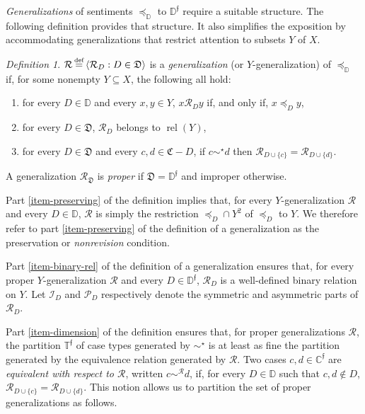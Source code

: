\documentclass[ecta,nameyear,draft]{econsocart}
\newcommand{\bs}{-}%
\newcommand{\mc}{\mathcal}
\newcommand\defeq{\mathrel{\overset{\makebox[0pt]{\mbox{\normalfont\tiny def}}}{=}}}%
\newcommand{\relations}{\operatorname{rel}}
\newcommand{\novel}{\mathfrak f}
\newcommand{\precsimb}{\mathbin{\preceq}}
\newcommand{\preceqb}{\mathbin{\preceq}}
\newcommand{\ext}{\mathrel{\mc R}}
\newcommand{\sext}{\mathrel{\mc P}}
\newcommand{\next}{\mathrel{\mc I}}
\newcommand{\extb}{\mathbin{\mc R}}
\newcommand{\mbbd}{{\mathds D}}
\newcommand{\mbbdp}{{\mathds D^{\novel}}}
\newcommand{\dpp}{{\mathfrak D}}
\newcommand{\mbbcp}{{\mathds C^{\novel}}}
\newcommand{\cpp}{{\mathfrak C}}
\newcommand{\mbbtp}{{\mathds{T}^\novel}}
\theoremstyle{plain}
\theoremstyle{remark}
\newtheorem{definition}{Definition}%
\begin{document}
\emph{Generalizations} of sentiments $\precsimb_\mbbd$ to
$\mbbdp$ require a suitable structure. The following definition provides that
structure. It also simplifies the exposition by accommodating generalizations
that restrict attention to subsets $Y$ of $X$.
\begin{definition}\label{def-{generalization}} $\extb \defeq \langle \extb_{D}:
  D\in \dpp \rangle$ is a \emph{{generalization}} (or $Y$-{generalization}) of
  $\preceq_{\mbbd}$ if, for some nonempty $Y \subseteq X$, the following all
  hold$:$
  \begin{enumerate}%
    \item \label{item-preserving} for every $D \in \mbbd$ and every $x,y\in Y$,
      $x \ext_{D} y$ if, and only if, $x \preceq_{D} y$,
    \item\label{item-binary-rel} for every $D\in \dpp$, $\ext_{D}$ belongs to
      $\relations (Y)$,
    \item \label{item-dimension} for every $D\in \dpp$ and every $c,d \in
      \cpp\bs D$,  if $c \sim^\star d$ then $\extb _ {D \cup \{c\}} = \extb _
      {D \cup \{d\}}$.
  \end{enumerate}
  A {generalization} $\ext_{\dpp}$ is \emph{proper} if $\dpp = \mbbdp$ and
  improper otherwise.
\end{definition}
Part \ref{item-preserving} of the definition implies that, for every
$Y$-{generalization} $\ext$ and every $D\in \mbbd$, $\ext$ is simply the
restriction $\preceqb_{D}\cap Y^{2}$ of $\preceq_{D}$ to $Y$.  We therefore
refer to part \ref{item-preserving} of the definition of a {generalization} as
the preservation or \emph{nonrevision} condition.

Part \ref{item-binary-rel} of the definition of a {generalization} ensures
that, for every proper $Y$-{generalization} $\ext$ and every $D\in \mbbdp$,
$\ext_{D}$ is a well-defined binary relation on $Y$.  Let $\next_{D}$ and
$\sext_{D}$ respectively denote the symmetric and asymmetric parts of
$\ext_{D}$.


Part \ref{item-dimension} of the definition ensures that, for proper
{generalization}s $\ext$, the partition $\mbbtp$ of case types generated by
$\sim^{\star}$ is at least as fine the partition generated by the equivalence
relation generated by $\ext$. Two cases $c,d \in \mbbcp$ are \emph{equivalent
with respect to $\ext$}, written $c \sim^{\extb} d$, if, for every $D \in
\mbbd$ such that $c,d \notin D$, $\extb_{D \cup \{c\}} = \extb_{D \cup \{d\}}$.
This notion allows us to partition the set of proper {generalization}s as
follows.
\end{document}
